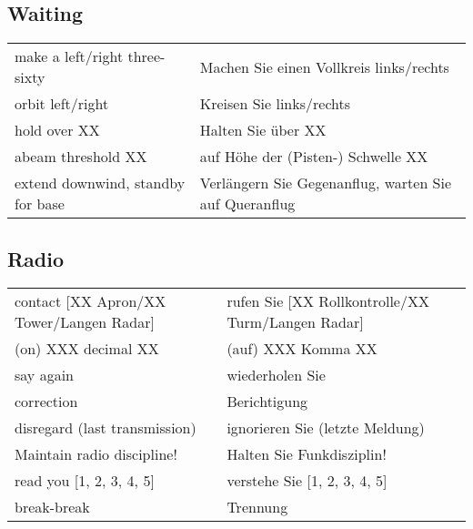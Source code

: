 \subsection{Waiting}
\begin{table}[H]
	\begin{tabularx}{\textwidth}{XX}
		make a left/right three-sixty     & Machen Sie einen Vollkreis links/rechts               \\
		orbit left/right   & Kreisen Sie links/rechts           \\
		hold over XX       & Halten Sie über XX                 \\
		abeam threshold XX & auf Höhe der (Pisten-) Schwelle XX \\
		extend downwind, standby for base & Verlängern Sie Gegenanflug, warten Sie auf Queranflug
	\end{tabularx}
\end{table}


\subsection{Radio}
\begin{table}[H]
	\begin{tabularx}{\textwidth}{XX}
		contact {[}XX Apron/XX Tower/Langen Radar{]}  & rufen Sie {[}XX Rollkontrolle/XX Turm/Langen Radar{]} \\
		\hspace{.75cm}(on) XXX decimal XX	  & \hspace{.75cm} (auf) XXX Komma XX \\
		say again                     & wiederholen Sie                  \\
		correction                    & Berichtigung                     \\
		disregard (last transmission) & ignorieren Sie (letzte Meldung)  \\
		Maintain radio discipline!    & Halten Sie Funkdisziplin!        \\
		read you {[}1, 2, 3, 4, 5{]}  & verstehe Sie {[}1, 2, 3, 4, 5{]} \\
		break-break                   & Trennung                        
	\end{tabularx}
\end{table}